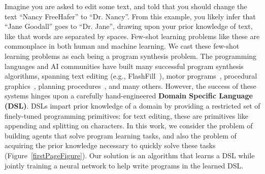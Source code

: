 \documentclass{article}
\begin{document}
Imagine you are asked  to edit some text, and
told that you should change the text ``Nancy FreeHafer'' to
``Dr. Nancy''.  From this example, you likely infer that ``Jane
Goodall'' goes to ``Dr. Jane'', drawing upon your prior knowledge of
text, like that words are separated by spaces. Few-shot learning problems
like these
are commonplace in both human and machine learning.
We cast these few-shot learning problems as each being a program synthesis problem.
The programming languages and AI communities have built many successful program synthesis algorithms,
spanning text editing (e.g., FlashFill~\cite{gulwani2011automating}), motor programs~\cite{lake2015human}, procedural graphics~\cite{ellis2017learning}, planning
procedures~\cite{devlin2017neural}, and many others.  However, the
success of these systems hinges upon a carefully
hand-engineered \textbf{Domain Specific Language (DSL)}.  DSLs
impart prior knowledge of a domain
by providing a restricted set
of finely-tuned programming primitives: for
text editing,
these are primitives like appending and splitting on characters.
In this work,
we consider the problem of
building agents that solve program learning tasks,
and also the problem of acquiring
the prior knowledge necessary to quickly
solve these tasks (Figure~\ref{firstPageFigure}).
Our solution is an algorithm that learns a DSL
while jointly training a neural network to help write programs in the learned DSL.
\end{document}
